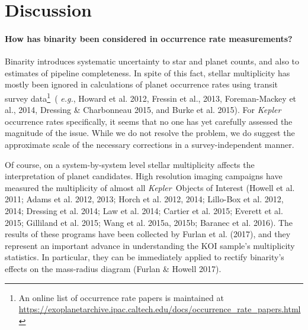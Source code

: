 \section{Discussion}
\label{sec:discussion}

\paragraph{How has binarity been considered in occurrence rate measurements?}
Binarity introduces systematic uncertainty to star and planet counts, and also 
to estimates of pipeline completeness.
In spite of this fact, stellar multiplicity has mostly been ignored in 
calculations of planet occurrence rates using transit survey data\footnote{
    An online list of occurrence rate papers is maintained at 
    \url{https://exoplanetarchive.ipac.caltech.edu/docs/occurrence_rate_papers.html}
}~({\it 
e.g.}, Howard et al. 2012, Fressin et al., 2013, Foreman-Mackey et 
al., 2014, Dressing \& Charbonneau 2015, and Burke et al. 2015).
For {\it Kepler} occurrence rates specifically, it seems that no one has yet 
carefully assessed the magnitude of the issue.
While we do not resolve the problem, we do suggest
the approximate scale of the necessary corrections in a survey-independent 
manner.

Of course, on a system-by-system level stellar multiplicity affects the 
interpretation of planet candidates. High resolution imaging 
campaigns have measured the multiplicity of almost all {\it Kepler}\ Objects 
of Interest 
(Howell et al. 2011; Adams et al. 2012, 2013; Horch et al. 2012, 2014; 
Lillo-Box et al. 2012, 2014; Dressing et al. 2014; Law et al. 2014; Cartier et 
al. 2015; Everett et al. 2015; Gilliland et al. 2015; Wang et al. 2015a, 
2015b; Baranec et al. 2016).
The results of these programs have been collected by Furlan et al. 
(2017), and they represent an important advance in understanding the KOI 
sample's multiplicity statistics.
In particular, they can be immediately applied to rectify binarity's effects 
on the mass-radius diagram (Furlan \& Howell 2017).

